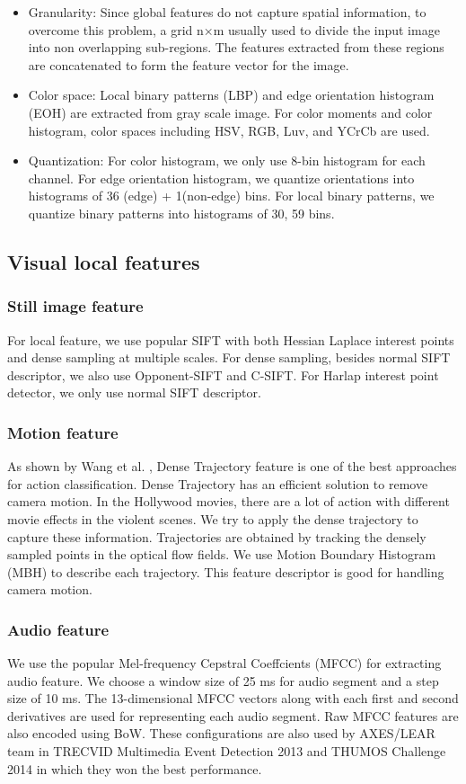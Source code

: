 \documentclass[review]{elsarticle}
\begin{document}
\begin{itemize}
	\item Granularity:  Since global features do not capture spatial information, to overcome this problem, a grid n×m usually used to divide the input image into non overlapping sub-regions. The features extracted from these regions are concatenated to form the feature vector for the image.
	\item Color space: Local binary patterns (LBP) and edge orientation histogram (EOH) are extracted from gray scale image. For color moments and color histogram, color spaces including HSV, RGB, Luv, and YCrCb are used.
	\item Quantization: For color histogram, we only use 8-bin histogram for each channel. For edge orientation histogram, we quantize orientations into histograms of 36 (edge) + 1(non-edge) bins. For local binary patterns, we quantize binary patterns into histograms of 30, 59 bins.
\end{itemize}

\subsection{Visual local features}
\subsubsection{Still image feature}

For local feature, we use popular SIFT with both Hessian Laplace interest points and dense sampling at multiple scales. For dense sampling, besides normal SIFT descriptor, we also use Opponent-SIFT and C-SIFT. For Harlap interest point detector, we only use normal SIFT descriptor.	

\subsubsection{Motion feature}
As shown by Wang et al. \cite{wang_dense}, Dense Trajectory feature is one of the best approaches for action classification. Dense Trajectory has an efficient solution to remove camera motion. In the Hollywood movies, there are a lot of action with different movie effects in the violent scenes. We try to apply the dense trajectory  to capture these information. Trajectories are obtained by tracking the densely sampled points in the optical flow fields. We use Motion Boundary Histogram (MBH) to describe each trajectory. This feature descriptor is good for handling camera motion. 
\subsubsection{Audio feature}
We use the popular Mel-frequency Cepstral Coeffcients (MFCC) \cite{rabiner2007introduction} for extracting audio feature. We choose a window size of 25 ms for audio segment and a step size of 10 ms. The 13-dimensional MFCC vectors along with each first and second derivatives are used for representing each audio segment. Raw MFCC features are also encoded using BoW. These configurations are also used by AXES/LEAR team in TRECVID Multimedia Event Detection 2013 \cite{aly2013axes} and THUMOS Challenge 2014 \cite{oneata2014lear} in which they won the best performance.
\end{document}
